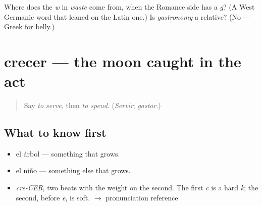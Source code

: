 \begin{tcolorbox}[breakable,colback=teal!4,colframe=teal!35!black,title={Before you move on}]
Where does the \emph{w} in \emph{waste} come from, when the Romance side has a \emph{g}? (A West Germanic word that leaned on the Latin one.) Is \emph{gastronomy} a relative? (No — Greek for belly.)
\end{tcolorbox}
\section[crecer]{crecer — the moon caught in the act}

\label{lesson:ES-C386-crecer}



\begin{quote}
Say \emph{to serve}, then \emph{to spend}. (\emph{Servir}; \emph{gastar}.)
\end{quote}

\subsection*{What to know first}
\begin{itemize}
\raggedright
  \item el árbol — something that grows.
  \item el niño — something else that grows.
\end{itemize}

\begin{sounds}
\begin{itemize}
\raggedright
  \item \emph{cre-CER}, two beats with the weight on the second. The first \emph{c} is a hard \emph{k}; the second, before \emph{e}, is soft. $\to$ pronunciation reference
\end{itemize}
\end{sounds}

